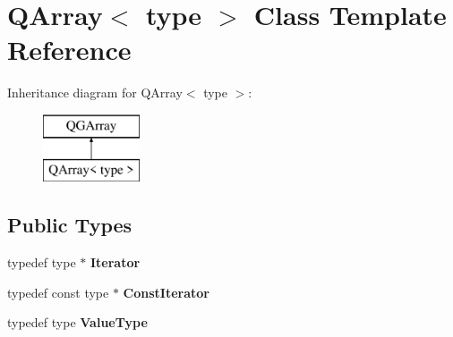 \hypertarget{class_q_array}{}\section{Q\+Array$<$ type $>$ Class Template Reference}
\label{class_q_array}
Inheritance diagram for Q\+Array$<$ type $>$\+:\begin{figure}[H]
\begin{center}
\leavevmode
\includegraphics[height=2.000000cm]{class_q_array}
\end{center}
\end{figure}
\subsection*{Public Types}
\begin{DoxyCompactItemize}
\item 
\mbox{\label{class_q_array_a34cdd5c57d2deab1dfd53e0d46e78cee}} 
typedef type $\ast$ {\bfseries Iterator}
\item 
\mbox{\label{class_q_array_a1bb994357ffeb855b3f19f6562137f93}} 
typedef const type $\ast$ {\bfseries Const\+Iterator}
\item 
\mbox{\label{class_q_array_a8360acb482596a511681e8dd1eadd0f0}} 
typedef type {\bfseries Value\+Type}
\end{DoxyCompactItemize}
